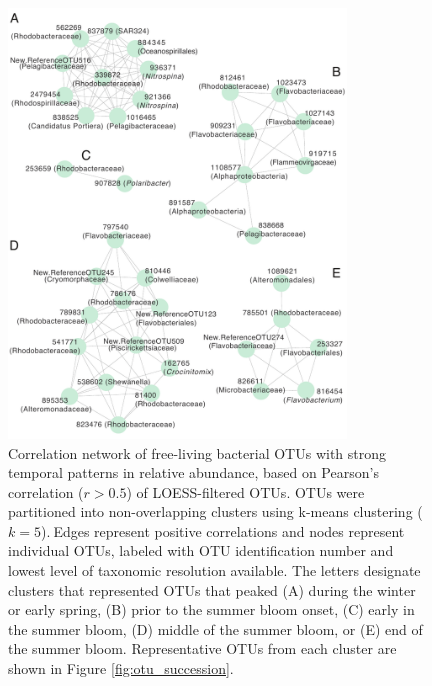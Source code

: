 \begin{figure}[htbp] 
\centering 
\includegraphics[width=0.8\textwidth]{Chapter_3_SWI/Figures/Figure_4_otu_network_LoessPrefilter_kmeans_Pearsons} 
\caption[Co-occurrence networks of OTUs that displayed strong temporal patterns in relative abundance.]{Correlation network of free-living bacterial OTUs with strong temporal patterns in relative abundance, based on Pearson's correlation ($r > 0.5$) of LOESS-filtered OTUs. OTUs were partitioned into non-overlapping clusters using k-means clustering ($k = 5$).${~}$Edges represent positive correlations and nodes represent individual OTUs, labeled with OTU identification number and lowest level of taxonomic resolution available. The letters designate clusters that represented OTUs that peaked (A) during the winter or early spring, (B) prior to the summer bloom onset, (C) early in the summer bloom, (D) middle of the summer bloom, or (E) end of the summer bloom. Representative OTUs from each cluster are shown in Figure \ref{fig:otu_succession}.} 
\label{fig:ch2_network_kmeans} 
\end{figure}

